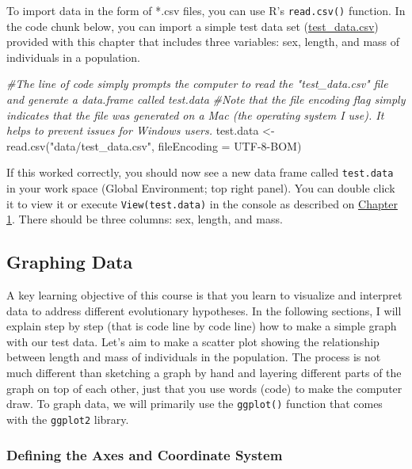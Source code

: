 \documentclass[
]{book}
\newenvironment{Shaded}{\begin{snugshade}}{\end{snugshade}}
\newcommand{\AttributeTok}[1]{\textcolor[rgb]{0.77,0.63,0.00}{#1}}
\newcommand{\CommentTok}[1]{\textcolor[rgb]{0.56,0.35,0.01}{\textit{#1}}}
\newcommand{\FunctionTok}[1]{\textcolor[rgb]{0.00,0.00,0.00}{#1}}
\newcommand{\NormalTok}[1]{#1}
\newcommand{\OtherTok}[1]{\textcolor[rgb]{0.56,0.35,0.01}{#1}}
\newcommand{\StringTok}[1]{\textcolor[rgb]{0.31,0.60,0.02}{#1}}
\begin{document}
To import data in the form of *.csv files, you can use R's \texttt{read.csv()} function. In the code chunk below, you can import a simple test data set (\href{data/test_data.csv}{test\_data.csv}) provided with this chapter that includes three variables: sex, length, and mass of individuals in a population.

\begin{Shaded}
\begin{Highlighting}[]
\CommentTok{\#The line of code simply prompts the computer to read the "test\_data.csv" file and generate a data.frame called test.data}
\CommentTok{\#Note that the file encoding flag simply indicates that the file was generated on a Mac (the operating system I use). It helps to prevent issues for Windows users.}
\NormalTok{test.data }\OtherTok{\textless{}{-}} \FunctionTok{read.csv}\NormalTok{(}\StringTok{"data/test\_data.csv"}\NormalTok{, }\AttributeTok{fileEncoding =} \StringTok{\textquotesingle{}UTF{-}8{-}BOM\textquotesingle{}}\NormalTok{)}
\end{Highlighting}
\end{Shaded}

If this worked correctly, you should now see a new data frame called \texttt{test.data} in your work space (Global Environment; top right panel). You can double click it to view it or execute \texttt{View(test.data)} in the console as described on \href{what-evolution-is.html\#data-frame}{Chapter 1}. There should be three columns: sex, length, and mass.

\hypertarget{graphing-data}{%
\subsection{Graphing Data}\label{graphing-data}}

A key learning objective of this course is that you learn to visualize and interpret data to address different evolutionary hypotheses. In the following sections, I will explain step by step (that is code line by code line) how to make a simple graph with our test data. Let's aim to make a scatter plot showing the relationship between length and mass of individuals in the population. The process is not much different than sketching a graph by hand and layering different parts of the graph on top of each other, just that you use words (code) to make the computer draw. To graph data, we will primarily use the \texttt{ggplot()} function that comes with the \texttt{ggplot2} library.

\hypertarget{defining-the-axes-and-coordinate-system}{%
\subsubsection*{Defining the Axes and Coordinate System}\label{defining-the-axes-and-coordinate-system}}
\end{document}
